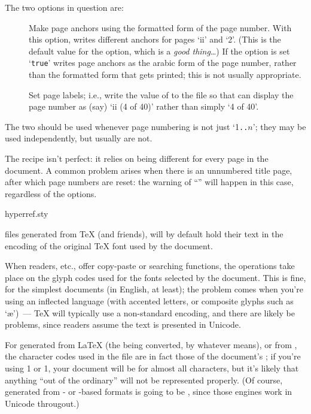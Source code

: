 The two options in question are:
\begin{description}
\item[] Make page anchors using the
  formatted form of the page number.  With this option,
   writes different anchors for pages `ii' and `2'.
  (This is the default value for the option, which is a %
  \emph{good thing}\dots{})
  If the option is set `\texttt{true}'  writes page
  anchors as the arabic form of the page number, rather than the
  formatted form that gets printed; this is not usually appropriate.
\item[] Set  page labels; i.e.,
  write the value of  to the  file so that
   can display the page number as (say) `ii (4
  of 40)' rather than simply `4 of 40'.
\end{description}
The two should be used whenever page numbering is not just
`1\texttt{..}\ensuremath{n}'; they may be used independently, but
usually are not.

The recipe isn't perfect: it relies on  being different
for every page in the document.  A common problem arises when there is
an unnumbered title page, after which page numbers are reset: the
\PDFTeX{} warning of ``''
will happen in this case, regardless of the options.
\begin{ctanrefs}
\item[hyperref.sty]
\end{ctanrefs}


 files generated from \TeX{} (and friends), will by default
hold their text in the encoding of the original \TeX{} font used by
the document.

When  readers, etc., offer copy-paste or searching
functions, the operations take place on the glyph codes used for the
fonts selected by the document.  This is fine, for the simplest
documents (in English, at least); the problem comes when you're using
an inflected language (with accented letters, or composite glyphs
such as `\ae{}')~--- \TeX{} will typically use a non-standard
encoding, and there are likely be problems, since  readers
assume the text is presented in Unicode.

For  generated from \LaTeX{} (the  being
converted, by whatever means), or from \pdflatex{}, the character
codes used in the  file are in fact those of the document's
; if you're using 1 or
1, your document will be  for almost all 
characters, but it's likely that anything ``out of the ordinary'' will
not be represented properly.  (Of course,  generated from
\xetex{}- or \LuaTeX{}-based formats is going to be , since
those engines work in Unicode througout.)

